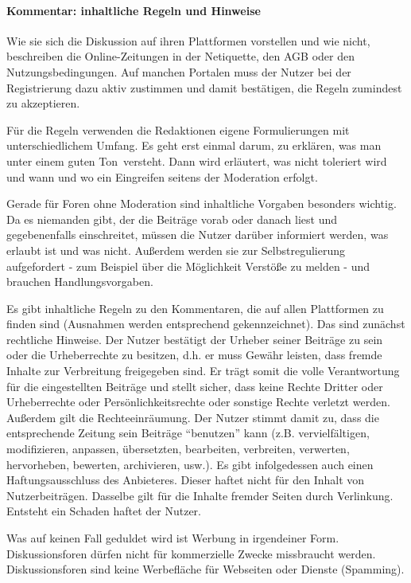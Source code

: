 \paragraph{Kommentar: inhaltliche Regeln und Hinweise}

Wie sie sich die Diskussion auf ihren Plattformen vorstellen und wie nicht,
beschreiben die Online-Zeitungen in der Netiquette, den AGB oder den
Nutzungsbedingungen. Auf manchen Portalen muss der Nutzer bei der Registrierung
dazu aktiv zustimmen und damit bestätigen, die Regeln zumindest zu akzeptieren.

Für die Regeln verwenden die Redaktionen eigene Formulierungen mit
unterschiedlichem Umfang. Es geht erst einmal darum, zu erklären, was man unter
einem \glqq guten Ton\grqq\ versteht. Dann wird erläutert, was nicht toleriert
wird und wann und wo ein Eingreifen seitens der Moderation erfolgt.

Gerade für Foren ohne Moderation sind inhaltliche Vorgaben besonders wichtig. Da
es niemanden gibt, der die Beiträge vorab oder danach liest und gegebenenfalls
einschreitet, müssen die Nutzer darüber informiert werden, was erlaubt ist und
was nicht. Außerdem werden sie zur Selbstregulierung aufgefordert - zum Beispiel
über die Möglichkeit Verstöße zu melden - und brauchen Handlungsvorgaben.

Es gibt inhaltliche Regeln zu den Kommentaren, die auf allen Plattformen zu
finden sind (Ausnahmen werden entsprechend gekennzeichnet).  Das sind zunächst
rechtliche Hinweise. Der Nutzer bestätigt der Urheber seiner Beiträge zu sein
oder die Urheberrechte zu besitzen, d.h. er muss Gewähr leisten, dass fremde
Inhalte zur Verbreitung freigegeben sind. Er trägt somit die volle Verantwortung
für die eingestellten Beiträge und stellt sicher, dass keine Rechte Dritter oder
Urheberrechte oder Persönlichkeitsrechte oder sonstige Rechte verletzt werden.
Außerdem gilt die Rechteeinräumung. Der Nutzer stimmt damit zu, dass die
entsprechende Zeitung sein Beiträge ``benutzen'' kann (z.B. vervielfältigen,
modifizieren, anpassen, übersetzten, bearbeiten, verbreiten, verwerten,
hervorheben, bewerten, archivieren, usw.).  Es gibt infolgedessen auch einen
Haftungsausschluss des Anbieteres. Dieser haftet nicht für den Inhalt von
Nutzerbeiträgen. Dasselbe gilt für die Inhalte fremder Seiten durch Verlinkung.
Entsteht ein Schaden haftet der Nutzer.

Was auf keinen Fall geduldet wird ist Werbung in irgendeiner Form.
Diskussionsforen dürfen nicht für kommerzielle Zwecke missbraucht werden.
Diskussionsforen sind keine Werbefläche für Webseiten oder Dienste (Spamming).

